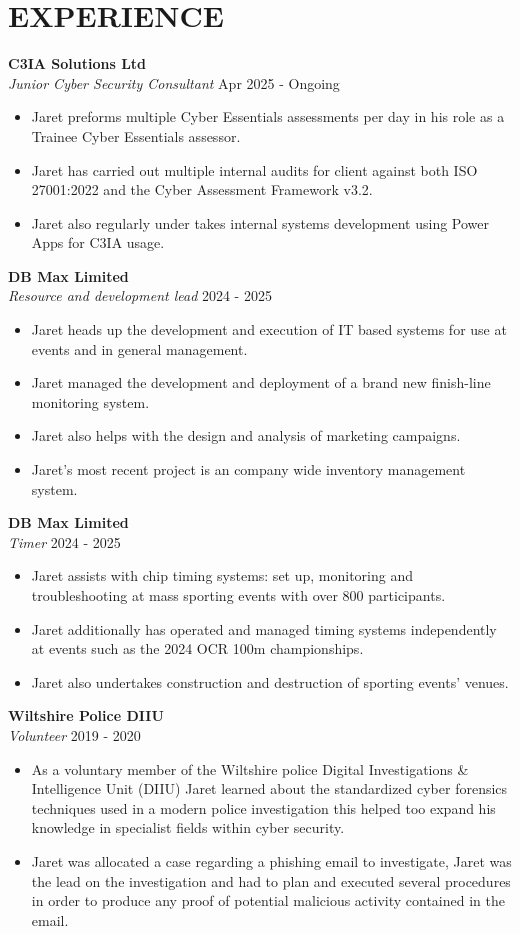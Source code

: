 \section*{EXPERIENCE}
\noindent
\textbf{C3IA Solutions Ltd}\\
\textit{Junior Cyber Security Consultant} \hfill Apr 2025 - Ongoing
\begin{itemize}
    \item Jaret preforms multiple Cyber Essentials assessments per day in his role as a Trainee Cyber Essentials assessor.
    \item Jaret has carried out multiple internal audits for client against both ISO 27001:2022 and the Cyber Assessment Framework v3.2.
    \item Jaret also regularly under takes internal systems development using Power Apps for C3IA usage.
\end{itemize}

\noindent
\textbf{DB Max Limited}\\
\textit{Resource and development lead} \hfill 2024 - 2025
\begin{itemize}
    \item Jaret heads up the development and execution of IT based systems for use at events and in general management.
    \item Jaret managed the development and deployment of a brand new finish-line monitoring system.
    \item Jaret also helps with the design and analysis of marketing campaigns.
    \item Jaret's most recent project is an company wide inventory management system.
\end{itemize}

\noindent
\textbf{DB Max Limited}\\
\textit{Timer} \hfill 2024 - 2025
\begin{itemize}
    \item Jaret assists with chip timing systems: set up, monitoring and troubleshooting at mass sporting events with over 800 participants.
    \item Jaret additionally has operated and managed timing systems independently at events such as the 2024 OCR 100m championships.
    \item Jaret also undertakes construction and destruction of sporting events' venues.
\end{itemize}

\noindent
\textbf{Wiltshire Police DIIU}\\
\textit{Volunteer} \hfill 2019 - 2020 
\begin{itemize}
    \item As a voluntary member of the Wiltshire police Digital Investigations \& Intelligence Unit (DIIU) Jaret learned about the standardized cyber forensics techniques used in a modern police investigation this helped too expand his knowledge in specialist fields within cyber security.
    \item Jaret was allocated a case regarding a phishing email to investigate, Jaret was the lead on the investigation and had to plan and executed several procedures in order to produce any proof of potential malicious activity contained in the email.
\end{itemize}
